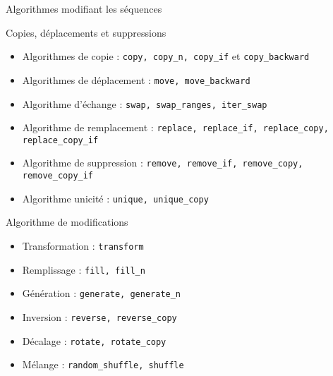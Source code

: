 \documentclass[handout,10pt]{beamer}
\begin{document}
\begin{frame}[fragile]{Algorithmes modifiant les séquences}
\tiny
\begin{block}{Copies, déplacements et suppressions}
 \begin{itemize}
  \item Algorithmes de copie : \lstinline$copy, copy_n, copy_if$ et \lstinline$copy_backward$
  \item Algorithmes de déplacement : \lstinline$move, move_backward$
  \item Algorithme d'échange : \lstinline$swap, swap_ranges, iter_swap$
  \item Algorithme de remplacement : \lstinline$replace, replace_if, replace_copy, replace_copy_if$
  \item Algorithme de suppression : \lstinline$remove, remove_if, remove_copy, remove_copy_if$
  \item Algorithme unicité : \lstinline$unique, unique_copy$
 \end{itemize}
 \end{block}
 \begin{block}{Algorithme de modifications}
 \begin{itemize}
  \item Transformation : \lstinline$transform$
  \item Remplissage : \lstinline$fill, fill_n$
  \item Génération  : \lstinline$generate, generate_n$
  \item Inversion : \lstinline$reverse, reverse_copy$
  \item Décalage : \lstinline$rotate, rotate_copy$
  \item Mélange : \lstinline$random_shuffle, shuffle$
 \end{itemize}
\end{block}
\end{frame}
\end{document}
